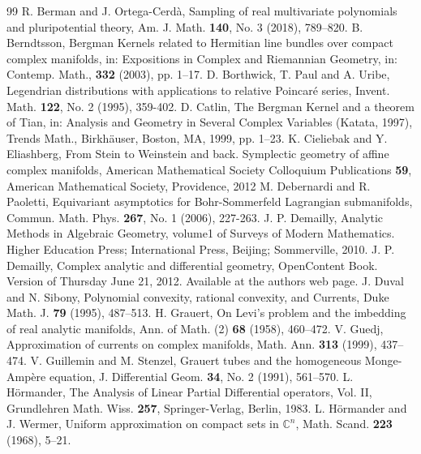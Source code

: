 \documentclass[12pt,oneside]{amsart}
\theoremstyle{plain}
\theoremstyle{definition}
\theoremstyle{remark}
\begin{document}
\begin{thebibliography}{99}
R. Berman and J. Ortega-Cerd\`a, 
Sampling of real multivariate polynomials and pluripotential theory, 
Am. J. Math. {\bf 140}, No. 3 (2018), 789--820.
B. Berndtsson, Bergman Kernels related to Hermitian line bundles over compact complex manifolds, in: Expositions in Complex and Riemannian Geometry, in: Contemp. Math., {\bf 332} (2003), pp. 1--17.  
D. Borthwick, T. Paul and A. Uribe, 
Legendrian distributions with applications to relative Poincar\'e series, 
Invent. Math. {\bf 122}, No. 2 (1995), 359-402.
D. Catlin, The Bergman Kernel and a theorem of Tian, in: Analysis and Geometry in Several Complex Variables (Katata, 1997), Trends Math., Birkh\"auser, Boston, MA, 1999, pp. 1--23.  
K. Cieliebak and Y. Eliashberg, 
From Stein to Weinstein and back. Symplectic geometry of affine complex manifolds, 
American Mathematical Society Colloquium Publications {\bf 59}, American Mathematical Society, Providence, 2012
M. Debernardi and R. Paoletti, 
Equivariant asymptotics for Bohr-Sommerfeld Lagrangian submanifolds, 
Commun. Math. Phys. {\bf 267}, No. 1 (2006), 227-263.
J. P. Demailly, 
Analytic Methods in Algebraic Geometry, volume1 of Surveys of Modern
Mathematics. Higher Education Press; International Press, Beijing; Sommerville, 2010.
J. P. Demailly, 
Complex analytic and differential geometry, OpenContent Book.  
Version of Thursday June 21, 2012.  Available at the authors web page.  
J. Duval and N. Sibony, 
Polynomial convexity, rational convexity, and Currents, Duke Math. J. {\bf 79} (1995), 487--513.  
H. Grauert, On Levi's problem and the imbedding of real analytic manifolds, Ann. of Math. (2) {\bf 68} (1958), 460--472.  
V. Guedj, Approximation of currents on complex manifolds, Math. Ann. {\bf 313} (1999), 437--474.  
V. Guillemin and M. Stenzel, 
Grauert tubes and the homogeneous Monge-Amp\`ere equation, 
J. Differential Geom. {\bf 34}, No. 2 (1991), 561--570.  
L. H\"ormander, 
The Analysis of Linear Partial Differential operators, Vol. II, Grundlehren Math. Wiss. {\bf 257}, Springer-Verlag, Berlin, 1983.   
L. H\"ormander and J. Wermer, Uniform approximation on compact sets in $\mathbb{C}^n$, Math. Scand. {\bf 223} (1968), 5--21.  

\end{thebibliography}
\end{document}
